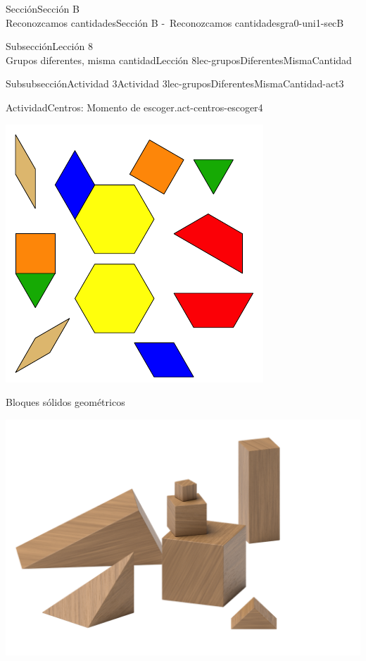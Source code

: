 \begin{sectionptx}{Sección}{{\Large Sección B\\}Reconozcamos cantidades}{}{Sección B -~Reconozcamos cantidades}{}{}{gra0-uni1-secB}
\begin{subsectionptx}{Subsección}{{\normalsize Lección 8\\[-0.05cm]}Grupos diferentes, misma cantidad}{}{Lección 8}{}{}{lec-gruposDiferentesMismaCantidad}
\begin{subsubsectionptx}{Subsubsección}{Actividad 3}{}{Actividad 3}{}{}{lec-gruposDiferentesMismaCantidad-act3}
\begin{activity}{Actividad}{Centros: Momento de escoger.}{act-centros-escoger4}
\begin{sidebyside}{2}{0.025}{0.025}{0.05}
\begin{sbspanel}{0.45}
\includegraphics[max width=\linewidth, center]{external/svg-source/tikz-file-147344.pdf}
\end{sbspanel}%
\end{sidebyside}%
\vspace*{1ex minus 0.8ex}
\begin{sidebyside}{2}{0.025}{0.025}{0.05}%
\begin{sbspanel}{0.45}%
Bloques sólidos geométricos%
\par
\includegraphics[max width=\linewidth, center]{external/png-source/K.1.A Beta Student Workbook.Geoblocks.png}

\end{sbspanel}
\end{sidebyside}
\end{activity}
\end{subsubsectionptx}
\end{subsectionptx}
\end{sectionptx}

